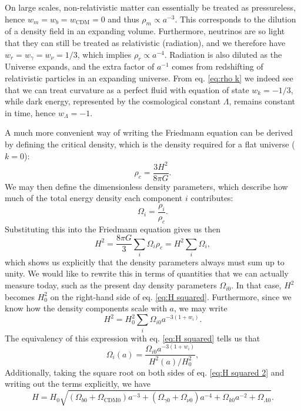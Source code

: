 \documentclass{aa}
\numberwithin{equation}{section}
\numberwithin{table}{section}
\numberwithin{figure}{section}
\begin{document}
On large scales, non-relativistic matter can essentially be treated as pressureless, hence $w_m = w_b=w_\text{CDM}=0$ and thus $\rho_m \propto a^{-3}$. This corresponds to the dilution of a density field in an expanding volume. Furthermore, neutrinos are so light that they can still be treated as relativistic (radiation), and we therefore have $w_r=w_\gamma=w_\nu=1/3$, which implies $\rho_r\propto a^{-4}$. Radiation is also diluted as the Universe expands, and the extra factor of $a^{-1}$ comes from redshifting of relativistic particles in an expanding universe. From eq. \eqref{eq:rho k} we indeed see that we can treat curvature as a perfect fluid with equation of state $w_k=-1/3$, while dark energy, represented by the cosmological constant $\Lambda$, remains constant in time, hence $w_\Lambda=-1$. 

A much more convenient way of writing the Friedmann equation can be derived by defining the critical density, which is the density required for a flat universe ($k=0$):
\begin{equation}
  \rho_c = \frac{3 H^2}{8 \pi G}.
\end{equation}
We may then define the dimensionless density parameters, which describe how much of the total energy density each component $i$ contributes:
\begin{equation}
  \Omega_i = \frac{\rho_{i}}{\rho_c}.
\end{equation}
Substituting this into the Friedmann equation gives us then
\begin{equation}
  H^2 = \frac{8\pi G}{3} \sum_i \Omega_{i}\rho_c = H^2\sum_i \Omega_{i}, \label{eq:H squared}
\end{equation}
which shows us explicitly that the density parameters always must sum up to unity. We would like to rewrite this in terms of quantities that we can actually measure today, such as the present day density parameters $\Omega_{i0}$. In that case, $H^2$ becomes $H_0^2$ on the right-hand side of eq. \eqref{eq:H squared}. Furthermore, since we know how the density components scale with $a$, we may write
\begin{equation}
  H^2 = H_0^2\sum_i \Omega_{i0}a^{-3(1+w_i)}. \label{eq:H squared 2}
\end{equation} 
The equivalency of this expression with eq. \eqref{eq:H squared} tells us that
\begin{equation}
  \Omega_{i}(a) = \frac{\Omega_{i0}a^{-3(1+w_i)}}{H^2(a)/H_0^2}, \label{eq:density params}
\end{equation}
Additionally, taking the square root on both sides of eq. \eqref{eq:H squared 2} and writing out the terms explicitly, we have
\begin{equation}
    H = H_0 \sqrt{(\Omega_{b0} + \Omega_{\text{CDM}0}) a^{-3} + (\Omega_{\gamma 0} + \Omega_{\nu 0}) a^{-4} + \Omega_{k0} a^{-2} + \Omega_{\Lambda 0}}.
\end{equation}
\end{document}
